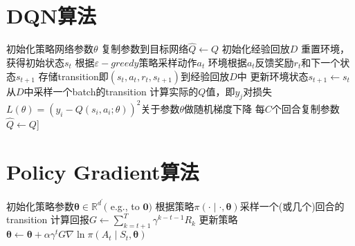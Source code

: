 \documentclass[11pt]{ctexart}
\begin{document}
\section{DQN算法}
\begin{algorithm}[H] %
    \renewcommand{\thealgorithm}{} %
	\caption{} 
    \renewcommand{\algorithmicrequire}{\textbf{输入:}}  
    \renewcommand{\algorithmicensure}{\textbf{输出:}} 
	\begin{algorithmic}[1]
		\STATE 初始化策略网络参数$\theta$ %
		\STATE 复制参数到目标网络$\hat{Q} \leftarrow Q$
		\STATE 初始化经验回放$D$
			\STATE 重置环境，获得初始状态$s_t$
				\STATE 根据$\varepsilon-greedy$策略采样动作$a_t$
				\STATE 环境根据$a_t$反馈奖励$r_t$和下一个状态$s_{t+1}$
				\STATE 存储transition即$(s_t,a_t,r_t,s_{t+1})$到经验回放$D$中
				\STATE 更新环境状态$s_{t+1} \leftarrow s_t$
				\STATE 从$D$中采样一个batch的transition
				\STATE 计算实际的$Q$值，即$y_{j}$\footnotemark[2]
				\STATE 对损失 $L(\theta)=\left(y_{i}-Q\left(s_{i}, a_{i} ; \theta\right)\right)^{2}$关于参数$\theta$做随机梯度下降\footnotemark[3]
			\ENDFOR
			\STATE 每$C$个回合复制参数$\hat{Q}\leftarrow Q$\footnotemark[4]]
		\ENDFOR
	\end{algorithmic}
\end{algorithm}
\clearpage
\section{Policy Gradient算法}
\begin{algorithm}[H] %
	\renewcommand{\thealgorithm}{} %
	\caption{} 
	\begin{algorithmic}[1] %
		\STATE 初始化策略参数$\boldsymbol{\theta} \in \mathbb{R}^{d^{\prime}}($ e.g., to $\mathbf{0})$
		\FOR {回合数 = $1,M$}
			\STATE 根据策略$\pi(\cdot \mid \cdot, \boldsymbol{\theta})$采样一个(或几个)回合的transition
			\FOR {时步 = $1,t$}
				\STATE 计算回报$G \leftarrow \sum_{k=t+1}^{T} \gamma^{k-t-1} R_{k}$
				\STATE 更新策略$\boldsymbol{\theta} \leftarrow {\boldsymbol{\theta}+\alpha \gamma^{t}} G \nabla \ln \pi\left(A_{t} \mid S_{t}, \boldsymbol{\theta}\right)$
			\ENDFOR
		\ENDFOR
	\end{algorithmic}
\end{algorithm}
\clearpage
\end{document}
